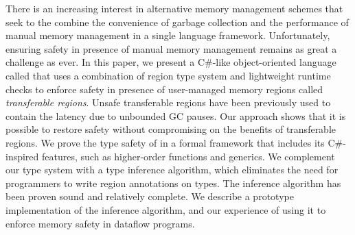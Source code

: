 There is an increasing interest in alternative memory management
schemes that seek to the combine the convenience of garbage collection
and the performance of manual memory management in a single language
framework.  Unfortunately, ensuring safety in presence of manual
memory management remains as great a challenge as ever. In this paper,
we present a C\#-like object-oriented language called \name that uses
a combination of region type system and lightweight runtime checks to
enforce safety in presence of user-managed memory regions called
\emph{transferable regions}. Unsafe transferable regions have been
previously used to contain the latency due to unbounded GC pauses. Our
approach shows that it is possible to restore safety without
compromising on the benefits of transferable regions.  We prove the
type safety of \name in a formal framework that includes its
C\#-inspired features, such as higher-order functions and generics. We
complement our type system with a type inference algorithm, which
eliminates the need for programmers to write region annotations on
types. The inference algorithm has been proven sound and relatively
complete. We describe a prototype implementation of the inference
algorithm, and our experience of using it to enforce memory safety in
dataflow programs.

